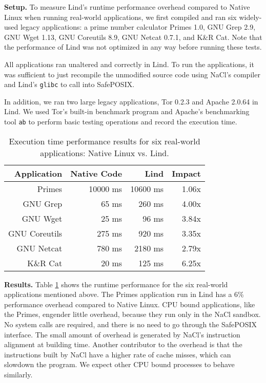 {{{%

\noindent
\textbf{Setup.}
To measure Lind's runtime performance overhead compared to Native Linux
 when running real-world applications,
we first compiled and ran six widely-used legacy applications:
a prime number calculator Primes 1.0,
GNU Grep 2.9, GNU Wget 1.13, GNU Coreutils 8.9,
GNU Netcat 0.7.1, and K\&R Cat. Note that the performance of Lind
was not optimized in any way before running these tests.

All applications ran unaltered and correctly in Lind. To run the applications,
it was sufficient to just recompile the unmodified
source code using NaCl's compiler and Lind's \texttt{glibc} to call
into SafePOSIX.

In addition, we ran two large legacy applications, Tor 0.2.3 and Apache 2.0.64 in Lind.
We used Tor's built-in benchmark program and Apache's benchmarking tool \texttt{ab} to perform
basic testing operations and record the execution time.

\begin{table}
\centering
\scriptsize
\begin{tabular}{|r|r|r|r|}
  \hline
  {\bf Application} & {\bf Native Code} & {\bf Lind} & {\bf Impact}  \\
  \hline
  Primes & 10000 ms & 10600 ms & 1.06x \\
  GNU Grep & 65 ms & 260 ms & 4.00x \\
  GNU Wget & 25 ms & 96 ms & 3.84x \\
  GNU Coreutils & 275 ms & 920 ms & 3.35x \\
  GNU Netcat & 780 ms & 2180 ms & 2.79x \\
  K\&R Cat & 20 ms & 125 ms & 6.25x \\
  \hline
\end{tabular}
\caption{\small Execution time performance results for six real-world applications: Native
Linux vs. Lind.}
\label{table:performance_apps}
\end{table}

\noindent
\textbf{Results.}
Table \ref{table:performance_apps} shows the runtime performance
for the six real-world applications mentioned above.
The Primes application run in Lind has a 6\% performance overhead compared to
Native Linux. CPU bound applications, like the Primes, engender little overhead,
because they run only in the NaCl sandbox. No system calls are
required, and there is no need to go through the SafePOSIX interface. The small
 amount of overhead is generated by NaCl's instruction alignment at building time.
  Another contributor to the overhead is that the instructions built by NaCl
  have a higher rate of cache misses, which can slowdown the
program. We expect other CPU bound processes to behave similarly.

}}}
